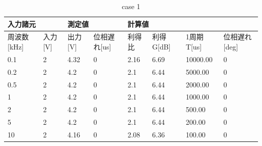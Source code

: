 \documentclass[dvipdfmx,titlepage,a4j]{jsarticle}  %
\begin{document}
\begin{table}[H]
  \centering
  \caption{case 1}
  \begin{tabular}{ll|ll|llll}
  \hline
  \multicolumn{2}{l|}{入力諸元}                        & \multicolumn{2}{l|}{測定値}                           & \multicolumn{4}{l}{計算値}                                                                                                                          \\ \hline
  \multicolumn{1}{l|}{周波数{[}kHz{]}} & 入力{[}V{]} & \multicolumn{1}{l|}{出力{[}V{]}} & 位相遅れ{[}us{]} & \multicolumn{1}{l|}{利得比} & \multicolumn{1}{l|}{利得G{[}dB{]}} & \multicolumn{1}{l|}{1周期T{[}us{]}} & \multicolumn{1}{l}{位相遅れ{[}deg{]}} \\ \hline \hline
  \multicolumn{1}{l|}{0.1}           & 2           & \multicolumn{1}{l|}{4.32}        & 0               & \multicolumn{1}{l|}{2.16}    & \multicolumn{1}{l|}{6.69}            & \multicolumn{1}{l|}{10000.00}        & 0                                   \\ \hline
  \multicolumn{1}{l|}{0.2}           & 2           & \multicolumn{1}{l|}{4.2}         & 0               & \multicolumn{1}{l|}{2.1}     & \multicolumn{1}{l|}{6.44}            & \multicolumn{1}{l|}{5000.00}         & 0                                   \\ \hline
  \multicolumn{1}{l|}{0.5}           & 2           & \multicolumn{1}{l|}{4.2}         & 0               & \multicolumn{1}{l|}{2.1}     & \multicolumn{1}{l|}{6.44}            & \multicolumn{1}{l|}{2000.00}         & 0                                   \\ \hline
  \multicolumn{1}{l|}{1}             & 2           & \multicolumn{1}{l|}{4.2}         & 0               & \multicolumn{1}{l|}{2.1}     & \multicolumn{1}{l|}{6.44}            & \multicolumn{1}{l|}{1000.00}         & 0                                   \\ \hline
  \multicolumn{1}{l|}{2}             & 2           & \multicolumn{1}{l|}{4.2}         & 0               & \multicolumn{1}{l|}{2.1}     & \multicolumn{1}{l|}{6.44}            & \multicolumn{1}{l|}{500.00}          & 0                                   \\ \hline
  \multicolumn{1}{l|}{5}             & 2           & \multicolumn{1}{l|}{4.2}         & 0               & \multicolumn{1}{l|}{2.1}     & \multicolumn{1}{l|}{6.44}            & \multicolumn{1}{l|}{200.00}          & 0                                   \\ \hline
  \multicolumn{1}{l|}{10}            & 2           & \multicolumn{1}{l|}{4.16}        & 0               & \multicolumn{1}{l|}{2.08}    & \multicolumn{1}{l|}{6.36}            & \multicolumn{1}{l|}{100.00}          & 0                                   \\ \hline

\end{tabular}
\end{table}
\end{document}
